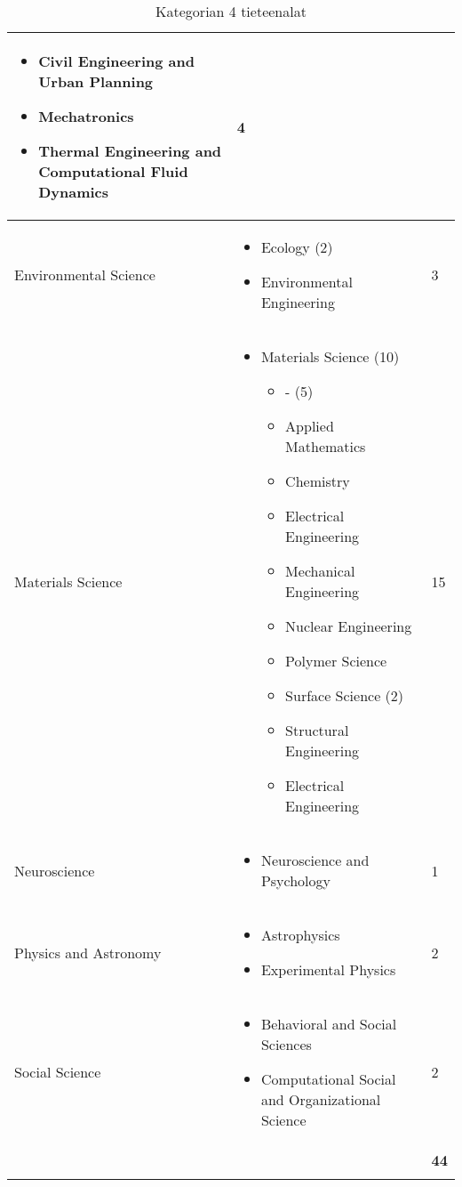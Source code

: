 \documentclass[utf8]{gradu3}
\begin{document}
\begin{longtable}[h]{|p{5cm}|p{8cm}|p{1cm}|}
\begin{itemize}
        \item Civil Engineering and Urban Planning
        \item Mechatronics
        \item Thermal Engineering and Computational Fluid Dynamics
    \end{itemize} & 4 \\
    \hline
    Environmental Science & \begin{itemize}
        \item Ecology (2)
        \item Environmental Engineering
    \end{itemize} & 3 \\
    \hline
    Materials Science & \begin{itemize}
        \item Materials Science (10)
        \begin{itemize}
            \item - (5)
            \item Applied Mathematics
            \item Chemistry
            \item Electrical Engineering
            \item Mechanical Engineering
            \item Nuclear Engineering
            \item Polymer Science
            \item Surface Science (2)
            \item Structural Engineering
            \item Electrical Engineering
        \end{itemize}
    \end{itemize} & 15 \\
    \hline
    Neuroscience & \begin{itemize}
        \item Neuroscience and Psychology
    \end{itemize} & 1 \\
    \hline
    Physics and Astronomy & \begin{itemize}
        \item Astrophysics
        \item Experimental Physics
    \end{itemize} & 2 \\
    \hline
    Social Science & \begin{itemize}
        \item Behavioral and Social Sciences
        \item Computational Social and Organizational Science
    \end{itemize} & 2 \\
    \hline
      &   & \textbf{44} \\
    \hline
    \caption{Kategorian 4 tieteenalat}
    \label{table:Kategorian 4 tieteenalat}
\end{longtable}
\end{document}
